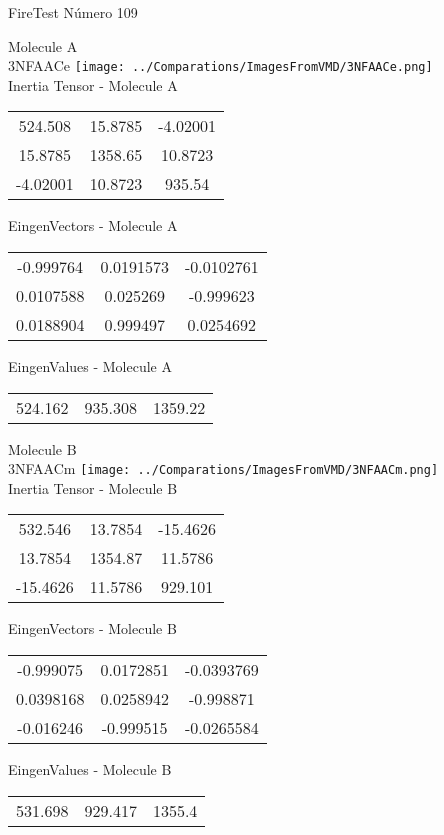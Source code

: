 \vtab[-2cm]
\begin{center}
{\large FireTest \tab Número 109}
\end{center}
\begin{multicols}{2}
\begin{center}

Molecule A \\ 
3NFAACe
\texttt{[image: ../Comparations/ImagesFromVMD/3NFAACe.png]}
\\
Inertia Tensor - Molecule A \\
\vtab

\begin{tabular}{|c c c|}
524.508	 & 	15.8785	 & 	-4.02001	 \\
15.8785	 & 	1358.65	 & 	10.8723	 \\
-4.02001	 & 	10.8723	 & 	935.54
\end{tabular}

\vtab
 EingenVectors - Molecule A     \\
\vtab
\begin{tabular}{|c c c|}
-0.999764	 & 	0.0191573	 & 	-0.0102761	 \\
0.0107588	 & 	0.025269	 & 	-0.999623	 \\
0.0188904	 & 	0.999497	 & 	0.0254692
\end{tabular}

\vtab
 EingenValues - Molecule A     \\
\vtab
\begin{tabular}{|c c c|}
524.162	 & 	935.308	 & 	1359.22	 \\
\end{tabular}
\columnbreak

Molecule B \\ 
3NFAACm
\texttt{[image: ../Comparations/ImagesFromVMD/3NFAACm.png]}
\\
Inertia Tensor - Molecule B \\
\vtab

\begin{tabular}{|c c c|}
532.546	 & 	13.7854	 & 	-15.4626	 \\
13.7854	 & 	1354.87	 & 	11.5786	 \\
-15.4626	 & 	11.5786	 & 	929.101
\end{tabular}

\vtab
 EingenVectors - Molecule B     \\
\vtab
\begin{tabular}{|c c c|}
-0.999075	 & 	0.0172851	 & 	-0.0393769	 \\
0.0398168	 & 	0.0258942	 & 	-0.998871	 \\
-0.016246	 & 	-0.999515	 & 	-0.0265584
\end{tabular}

\vtab
 EingenValues - Molecule B     \\
\vtab
\begin{tabular}{|c c c|}
531.698	 & 	929.417	 & 	1355.4	 \\
\end{tabular}

\end{center}
\end{multicols}
